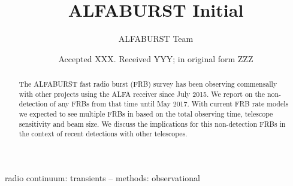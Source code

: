 \documentclass[a4paper,fleqn,usenatbib]{mnras}
\title[ALFABURST Initial]{ALFABURST Initial}
\author[ALFABURST Team]{
ALFABURST Team
}
\date{Accepted XXX. Received YYY; in original form ZZZ}
\begin{document}
\label{firstpage}
\pagerange{\pageref{firstpage}--\pageref{lastpage}}
\maketitle

\begin{abstract}
The ALFABURST fast radio burst (FRB) survey has been observing commensally with
other projects using the ALFA receiver since July 2015. We report on the
non-detection of any FRBs from that time until May 2017. With current FRB rate
models we expected to see multiple FRBs in based on the total observing time,
telescope sensitivity and beam size. We discuss the implications for this
non-detection FRBs in the context of recent detections with other telescopes.
\end{abstract}

\begin{keywords}
radio continuum: transients -- methods: observational
\end{keywords}


\end{document}
